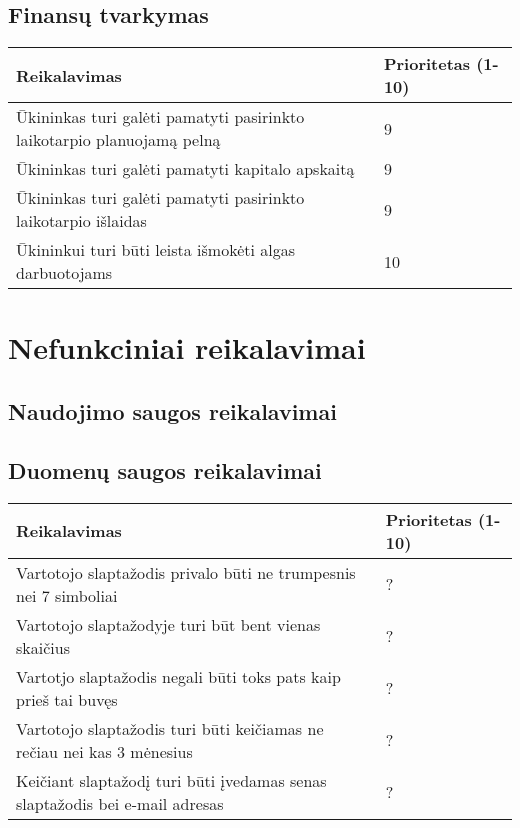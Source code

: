 \documentclass[oneside]{VUMIFPSkursinis}
\begin{document}
\subsection{Finansų tvarkymas}

\begin{table}[htbp]
	\begin{tabularx}{1\textwidth}{ |X|P{3cm }| }
       	          \hline
           	Reikalavimas &  Prioritetas (1-10)  \\   \hline 
        		Ūkininkas turi galėti pamatyti pasirinkto laikotarpio planuojamą pelną  &  9  \\   \hline
         		Ūkininkas turi galėti pamatyti kapitalo apskaitą &  9  \\   \hline
        		Ūkininkas turi galėti pamatyti pasirinkto laikotarpio išlaidas  & 9  \\   \hline
        		Ūkininkui turi būti leista išmokėti algas darbuotojams & 10 \\ \hline
	\end{tabularx}
\end{table}

\section{Nefunkciniai reikalavimai}


\subsection{Naudojimo saugos reikalavimai}

\subsection{Duomenų saugos reikalavimai}

\begin{table}[htbp]
	\begin{tabularx}{1\textwidth}{ |X|P{3cm }| }
       	          \hline
           	Reikalavimas &  Prioritetas (1-10)  \\   \hline 
        		Vartotojo slaptažodis privalo būti ne trumpesnis nei 7 simboliai  &  ?  \\   \hline
         		Vartotojo slaptažodyje turi būt bent vienas skaičius &  ? \\   \hline
        		Vartotjo slaptažodis negali būti toks pats kaip prieš tai buvęs & ? \\   \hline
        		Vartotojo slaptažodis turi būti keičiamas ne rečiau nei kas 3 mėnesius & ? \\ \hline
        		Keičiant slaptažodį turi būti įvedamas senas slaptažodis bei e-mail adresas & ? \\ \hline
        		
	\end{tabularx}
\end{table}
\end{document}
